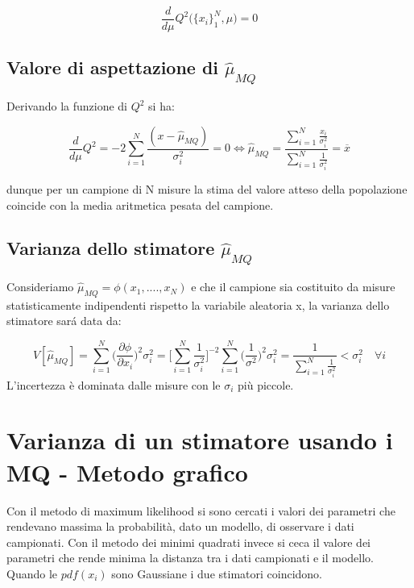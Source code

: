 \documentclass[11pt,a4paper]{book}
\begin{document}
\begin{equation}
	\dfrac{d}{d\mu}Q^2 \Big(\{x_i\}_1^N, \mu \Big) = 0
\end{equation}
 

\subsection{Valore di aspettazione di $\hat{\mu}_{MQ}$}

Derivando la funzione di $Q^2$ si ha:

\begin{equation*}
	\dfrac{d}{d\mu}Q^2 = -2 \sum_{i=1}^N \dfrac{(x-\hat{\mu}_{MQ})}{\sigma_i^2} = 0 \iff  \hat{\mu}_{MQ} = \dfrac{\sum_{i=1}^N \frac{x_i}{\sigma_i^2}}{\sum_{i=1}^N \frac{1}{\sigma^2_i}}= \overline{x}
\end{equation*}

\noindent dunque per un campione di N misure la stima del valore atteso della popolazione coincide con la media aritmetica pesata del campione.

\subsection{Varianza dello stimatore $\hat{\mu}_{MQ}$}

Consideriamo $\hat{\mu}_{MQ} = \phi(x_1,....,x_N)$ e che il campione sia costituito da misure statisticamente indipendenti rispetto la variabile aleatoria x, la varianza dello stimatore sar\'{a} data da:

\begin{equation*}
	V[\hat{\mu}_{MQ}] = \sum_{i=1}^{N} \Big (\dfrac{\partial \phi}{\partial x_{i}} \Big)^2 \sigma_i^2 = \Big [\sum_{i=1}^N \frac{1}{\sigma^2_i} \Big ]^{-2} \sum_{i=1}^N \Big(\dfrac{1}{\sigma^2}\Big)^2 \sigma_i^2 = \dfrac{1}{\sum_{i=1}^N \frac{1}{\sigma^2_i}} < \sigma_i^2 \quad \forall i  
\end{equation*}
L'incertezza \`{e} dominata dalle misure con le $\sigma_{i}$ pi\`{u} piccole.

\section{Varianza di un stimatore usando i MQ - Metodo grafico}

Con il metodo di maximum likelihood si sono cercati i valori dei parametri che rendevano massima la probabilit\`{a}, dato un modello, di osservare i dati campionati. Con il metodo dei minimi quadrati invece si ceca il valore dei parametri che rende minima la distanza tra i dati campionati e il modello. Quando le $pdf(x_i)$ sono Gaussiane i due stimatori coincidono.
\end{document}
